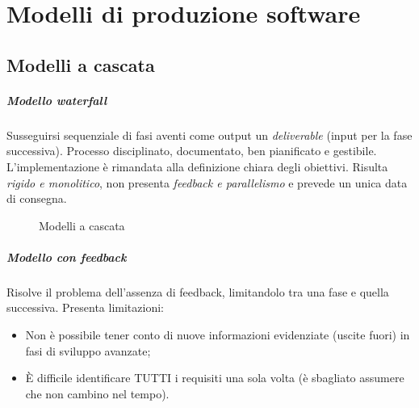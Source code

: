 \chapter{Modelli di produzione software}

\section{Modelli a cascata}

\paragraph{Modello waterfall} Susseguirsi sequenziale di fasi aventi come output un \textit{deliverable} (input per la fase successiva). Processo disciplinato, documentato, ben pianificato e gestibile. L'implementazione è rimandata alla definizione chiara degli obiettivi. Risulta \textit{rigido e monolitico}, non presenta \textit{feedback e parallelismo} e prevede un unica data di consegna.

\begin{figure}[H]
  \centering
  \label{fig:waterfall}
  \hfill
  \label{fig:waterfall-fb}
  \caption{Modelli a cascata}
\end{figure}

\paragraph{Modello con feedback} Risolve il problema dell'assenza di feedback, limitandolo tra una fase e quella successiva. Presenta limitazioni:
\begin{itemize}
    \item Non è possibile tener conto di nuove informazioni evidenziate (uscite fuori) in fasi di sviluppo avanzate;
    \item È difficile identificare TUTTI i requisiti una sola volta (è sbagliato assumere che non cambino nel tempo).
\end{itemize}


